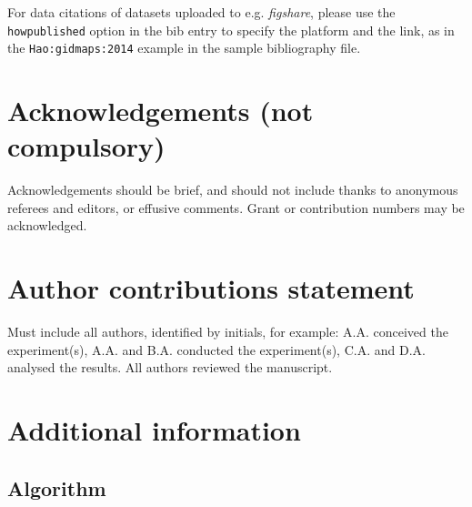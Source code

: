 \documentclass[fleqn,10pt]{wlscirep}
\begin{document}
For data citations of datasets uploaded to e.g. \emph{figshare}, please use the \verb|howpublished| option in the bib entry to specify the platform and the link, as in the \verb|Hao:gidmaps:2014| example in the sample bibliography file.

\section*{Acknowledgements (not compulsory)}

Acknowledgements should be brief, and should not include thanks to anonymous referees and editors, or effusive comments. Grant or contribution numbers may be acknowledged.

\section*{Author contributions statement}

Must include all authors, identified by initials, for example:
A.A. conceived the experiment(s),  A.A. and B.A. conducted the experiment(s), C.A. and D.A. analysed the results.  All authors reviewed the manuscript. 

\section*{Additional information}

\subsection*{Algorithm}
\label{algorithms}
\end{document}
